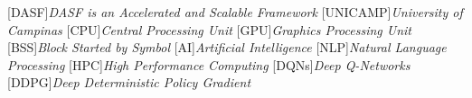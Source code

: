 [DASF]{\emph{DASF is an Accelerated and Scalable Framework}}
[UNICAMP]{\emph{University of Campinas}}
[CPU]{\emph{Central Processing Unit}}
[GPU]{\emph{Graphics Processing Unit}}
[BSS]{\emph{Block Started by Symbol}}
[AI]{\emph{Artificial Intelligence}}
[NLP]{\emph{Natural Language Processing}}
[HPC]{\emph{High Performance Computing}}
[DQNs]{\emph{Deep Q-Networks}}
[DDPG]{\emph{Deep Deterministic Policy Gradient}}
